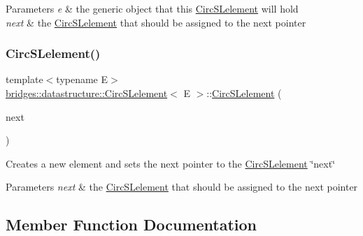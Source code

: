 \begin{DoxyParams}{Parameters}
{\em e} & the generic object that this \mbox{\hyperlink{classbridges_1_1datastructure_1_1_circ_s_lelement}{Circ\+S\+Lelement}} will hold \\
\hline
{\em next} & the \mbox{\hyperlink{classbridges_1_1datastructure_1_1_circ_s_lelement}{Circ\+S\+Lelement}} that should be assigned to the next pointer \\
\hline
\end{DoxyParams}
\mbox{\label{classbridges_1_1datastructure_1_1_circ_s_lelement_a89f06ba76b1fdf1d2343c5f18f226722}} 
\subsubsection{\texorpdfstring{CircSLelement()}{CircSLelement()}\hspace{0.1cm}{\footnotesize\ttfamily [4/4]}}
{\footnotesize\ttfamily template$<$typename E$>$ \\
\mbox{\hyperlink{classbridges_1_1datastructure_1_1_circ_s_lelement}{bridges\+::datastructure\+::\+Circ\+S\+Lelement}}$<$ E $>$\+::\mbox{\hyperlink{classbridges_1_1datastructure_1_1_circ_s_lelement}{Circ\+S\+Lelement}} (\begin{DoxyParamCaption}\item[{\mbox{\hyperlink{classbridges_1_1datastructure_1_1_circ_s_lelement}{Circ\+S\+Lelement}}$<$ E $>$ $\ast$}]{next }\end{DoxyParamCaption})\hspace{0.3cm}{\ttfamily [inline]}}

Creates a new element and sets the next pointer to the \mbox{\hyperlink{classbridges_1_1datastructure_1_1_circ_s_lelement}{Circ\+S\+Lelement}} \char`\"{}next\char`\"{} 
\begin{DoxyParams}{Parameters}
{\em next} & the \mbox{\hyperlink{classbridges_1_1datastructure_1_1_circ_s_lelement}{Circ\+S\+Lelement}} that should be assigned to the next pointer \\
\hline
\end{DoxyParams}


\subsection{Member Function Documentation}
\mbox{\label{classbridges_1_1datastructure_1_1_circ_s_lelement_a775ba08a7811fe91c396cb27ba9343ab}} 
